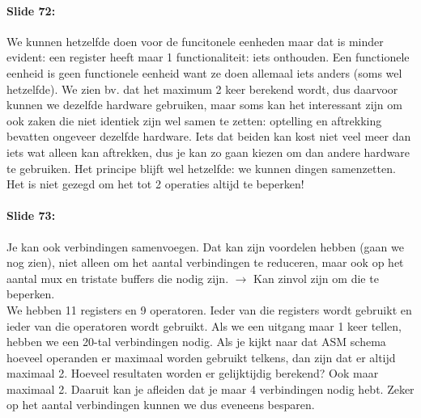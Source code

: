 \documentclass[10pt,a4paper]{book}
\begin{document}
\paragraph{Slide 72:} We kunnen hetzelfde doen voor de funcitonele eenheden maar dat is minder evident: een register heeft maar 1 functionaliteit: iets onthouden. Een functionele eenheid is geen functionele eenheid want ze doen allemaal iets anders (soms wel hetzelfde). We zien bv. dat het maximum 2 keer berekend wordt, dus daarvoor kunnen we dezelfde hardware gebruiken, maar soms kan het interessant zijn om ook zaken die niet identiek zijn wel samen te zetten: optelling en aftrekking bevatten ongeveer dezelfde hardware. Iets dat beiden kan kost niet veel meer dan iets wat alleen kan aftrekken, dus je kan zo gaan kiezen om dan andere hardware te gebruiken. Het principe blijft wel hetzelfde: we kunnen dingen samenzetten. Het is niet gezegd om het tot 2 operaties altijd te beperken!

\paragraph{Slide 73:} Je kan ook verbindingen samenvoegen. Dat kan zijn voordelen hebben (gaan we nog zien), niet alleen om het aantal verbindingen te reduceren, maar ook op het aantal mux en tristate buffers die nodig zijn. $\rightarrow$ Kan zinvol zijn om die te beperken.\\
We hebben 11 registers en 9 operatoren. Ieder van die registers wordt gebruikt en ieder van die operatoren wordt gebruikt. Als we een uitgang maar 1 keer tellen, hebben we een 20-tal verbindingen nodig. Als je kijkt naar dat ASM schema hoeveel operanden er maximaal worden gebruikt telkens, dan zijn dat er altijd maximaal 2. Hoeveel resultaten worden er gelijktijdig berekend? Ook maar maximaal 2. Daaruit kan je afleiden dat je maar 4 verbindingen nodig hebt. Zeker op het aantal verbindingen kunnen we dus eveneens besparen.
\end{document}
